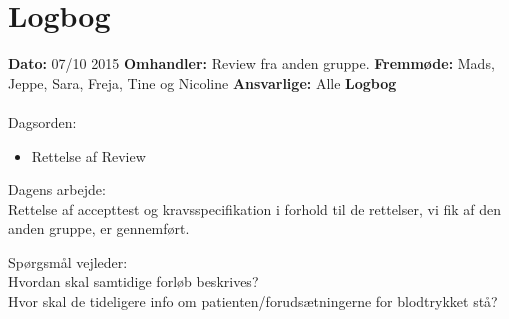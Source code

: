 \chapter{Logbog}

\textbf{Dato:} 07/10 2015
\textbf{Omhandler:} Review fra anden gruppe.
\textbf{Fremmøde:} Mads, Jeppe, Sara, Freja, Tine og Nicoline
\textbf{Ansvarlige:} Alle
\textbf{Logbog}
\\
\\
Dagsorden:
\begin{itemize}
	\item Rettelse af Review
\end{itemize}

Dagens arbejde: \\
Rettelse af accepttest og kravsspecifikation i forhold til de rettelser, vi fik af den anden gruppe, er gennemført. 

Spørgsmål vejleder: \\
Hvordan skal samtidige forløb beskrives?\\
Hvor skal de tideligere info om patienten/forudsætningerne for blodtrykket stå? \\
\\

